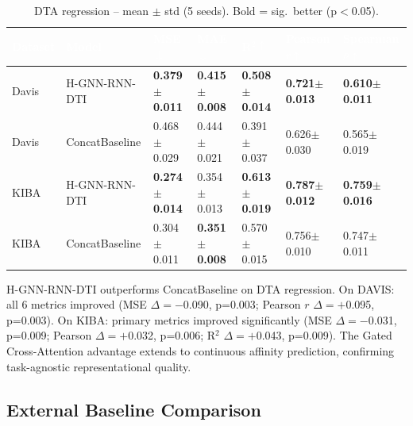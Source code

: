 \documentclass[12pt,a4paper,oneside]{report}
\newcommand{\sig}[1]{\textbf{#1}}
\begin{document}
\begin{table}[htbp]
\centering
\caption{DTA regression -- mean $\pm$ std (5 seeds). Bold = sig.\ better (p${<}$0.05).}
\label{tab:dta}
\begin{tabular}{@{}L{1.8cm}L{2.2cm}C{1.7cm}C{1.4cm}C{1.4cm}C{1.6cm}C{1.6cm}@{}}
\toprule
{}
\textcolor{white}{\textbf{Dataset}} &
\textcolor{white}{\textbf{Model}} &
\textcolor{white}{\textbf{MSE$\downarrow$}} &
\textcolor{white}{\textbf{MAE$\downarrow$}} &
\textcolor{white}{\textbf{R$^2\uparrow$}} &
\textcolor{white}{\textbf{Pearson $r\uparrow$}} &
\textcolor{white}{\textbf{Spearman $\rho\uparrow$}} \\
\midrule
{}
Davis & H-GNN-RNN-DTI  & \sig{0.379$\pm$0.011} & \sig{0.415$\pm$0.008} & \sig{0.508$\pm$0.014} & \sig{0.721$\pm$0.013} & \sig{0.610$\pm$0.011} \\
Davis & ConcatBaseline & 0.468$\pm$0.029 & 0.444$\pm$0.021 & 0.391$\pm$0.037 & 0.626$\pm$0.030 & 0.565$\pm$0.019 \\
KIBA  & H-GNN-RNN-DTI  & \sig{0.274$\pm$0.014} & 0.354$\pm$0.013 & \sig{0.613$\pm$0.019} & \sig{0.787$\pm$0.012} & \sig{0.759$\pm$0.016} \\
KIBA  & ConcatBaseline & 0.304$\pm$0.011 & \sig{0.351$\pm$0.008} & 0.570$\pm$0.015 & 0.756$\pm$0.010 & 0.747$\pm$0.011 \\
\bottomrule
\end{tabular}
\end{table}

H-GNN-RNN-DTI outperforms ConcatBaseline on DTA regression. On DAVIS: all 6 metrics improved (MSE $\Delta=-$0.090, p=0.003; Pearson $r$ $\Delta=+$0.095, p=0.003). On KIBA: primary metrics improved significantly (MSE $\Delta=-$0.031, p=0.009; Pearson $\Delta=+$0.032, p=0.006; R$^2$ $\Delta=+$0.043, p=0.009). The Gated Cross-Attention advantage extends to continuous affinity prediction, confirming task-agnostic representational quality.

\subsection{External Baseline Comparison}
\end{document}
